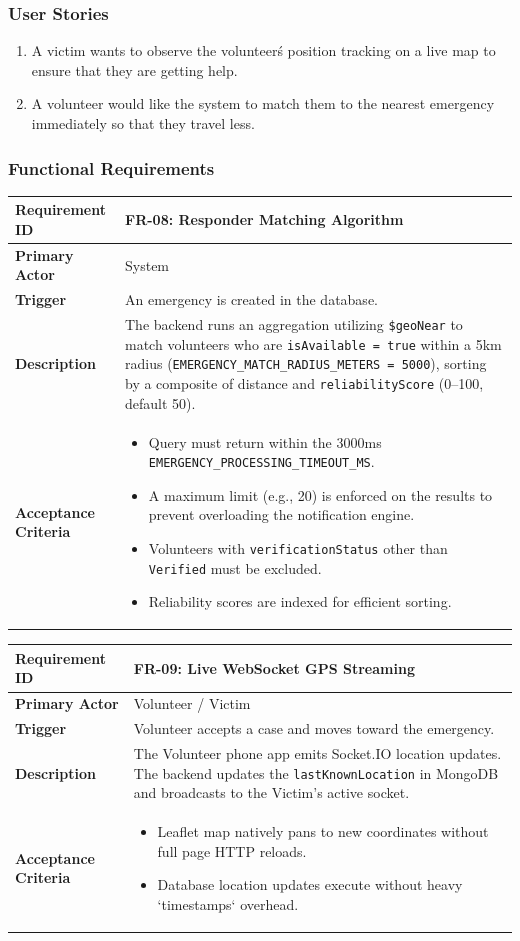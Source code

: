 \documentclass[12pt,a4paper]{article}
\newcommand{\frbox}[5]{%
  \begin{table}[H]
  \centering
  \begin{tabularx}{\textwidth}{|l|X|}
  \hline
  \rowcolor{lightorange}
  \textbf{Requirement ID} & \textbf{#1} \\
  \hline
  \textbf{Primary Actor} & #2 \\
  \hline
  \textbf{Trigger} & #3 \\
  \hline
  \textbf{Description} & #4 \\
  \hline
  \rowcolor{lightorange}
  \textbf{Acceptance Criteria} & #5 \\
  \hline
  \end{tabularx}
  \end{table}
}
\begin{document}
\subsubsection*{User Stories}
\begin{enumerate}[leftmargin=2em]
  \item A victim wants to observe the volunteer\'s position tracking on a live map to ensure that they are getting help.
  \item A volunteer would like the system to match them to the nearest emergency immediately so that they travel less.
\end{enumerate}

\subsubsection*{Functional Requirements}

\frbox{FR-08: Responder Matching Algorithm}
{System}
{An emergency is created in the database.}
{The backend runs an aggregation utilizing \texttt{\$geoNear} to match volunteers who are \texttt{isAvailable = true} within a 5km radius (\texttt{EMERGENCY\_MATCH\_RADIUS\_METERS = 5000}), sorting by a composite of distance and \texttt{reliabilityScore} (0--100, default 50).}
{%
\begin{itemize}[leftmargin=1.5em]
  \item Query must return within the 3000ms \texttt{EMERGENCY\_PROCESSING\_TIMEOUT\_MS}.
  \item A maximum limit (e.g., 20) is enforced on the results to prevent overloading the notification engine.
  \item Volunteers with \texttt{verificationStatus} other than \texttt{Verified} must be excluded.
  \item Reliability scores are indexed for efficient sorting.
\end{itemize}
}

\frbox{FR-09: Live WebSocket GPS Streaming}
{Volunteer / Victim}
{Volunteer accepts a case and moves toward the emergency.}
{The Volunteer phone app emits Socket.IO location updates. The backend updates the \texttt{lastKnownLocation} in MongoDB and broadcasts to the Victim's active socket.}
{%
\begin{itemize}[leftmargin=1.5em]
  \item Leaflet map natively pans to new coordinates without full page HTTP reloads.
  \item Database location updates execute without heavy `timestamps` overhead.
\end{itemize}
}
\end{document}
